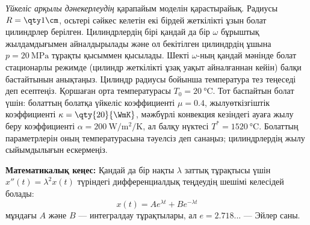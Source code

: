 
\textit{Үйкеліс арқылы дәнекерлеудің} қарапайым моделін қарастырайық. Радиусы $R=\qty1{\cm}$, осьтері сәйкес келетін екі бірдей жеткілікті ұзын болат цилиндрлер берілген. Цилиндрлердің бірі қандай да бір $\omega$ бұрыштық жылдамдығымен айналдырылады және ол бекітілген цилиндрдің ұшына $p=\qty{20}{\MPa}$ тұрақты қысыммен қысылады. Шекті $\omega$-ның қандай мәнінде болат стационарлы режимде (цилиндр жеткілікті ұзақ уақыт айналғаннан кейін) балқи бастайтынын анықтаңыз. Цилиндр радиусы бойынша температура тез теңеседі деп есептеңіз. Қоршаған орта температурасы $T_0=\qty{20}{\celsius}$. Тот баспайтын болат үшін: болаттың болатқа үйкеліс коэффициенті $\mu=0.4$, жылуөткізгіштік коэффициенті $\kappa=\qty{20}{\WmK}$, мәжбүрлі конвекция кезіндегі ауаға жылу беру коэффициенті $\alpha=\qty{200}{\W\per\metre\squared\per\kelvin}$, ал балқу нүктесі $T^*=\qty{1520}{\celsius}$. Болаттың параметрлерін оның температурасына тәуелсіз деп санаңыз; цилиндрлердің жылу сыйымдылығын ескермеңіз.

\textbf{Математикалық кеңес:} Қандай да бір нақты $\lambda$ заттық тұрақтысы үшін $x''(t) = \lambda^2 x(t)$ түріндегі дифференциалдық теңдеудің шешімі келесідей болады:
$$
x(t) = Ae^{\lambda t} + Be^{-\lambda t}
$$
мұндағы $A$ және $B$ --- интегралдау тұрақтылары, ал $e=2.718...$ --- Эйлер саны.
